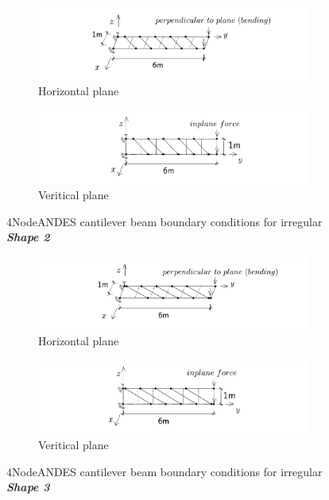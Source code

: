\documentclass[fleqn,11pt]{article}
\begin{document}
\begin{figure}[H]
  \centering
    \begin{subfigure}{0.5\textwidth}
      \centering
      \includegraphics[width=9cm]{../Figure-files/beam_ANDES_xy_bending_shape2.pdf}
      \caption{Horizontal plane}
    \end{subfigure}
    \begin{subfigure}{0.5\textwidth}
      \centering
      \includegraphics[width=9cm]{../Figure-files/beam_ANDES_yz_inPlane_shape2.pdf}
      \caption{Veritical  plane}
    \end{subfigure}
      \captionsetup{justification=centering,margin=3cm}
  \caption{4NodeANDES cantilever beam boundary conditions for irregular \textbf{\emph{Shape 2}} }
  \label{fig irregular shape 2 4NodeANDES cantilever beams bc}
\end{figure}





\begin{figure}[H]
  \centering
    \begin{subfigure}{0.5\textwidth}
      \centering
      \includegraphics[width=9cm]{../Figure-files/beam_ANDES_xy_bending_shape3.pdf}
      \caption{Horizontal plane}
    \end{subfigure}
    \begin{subfigure}{0.5\textwidth}
      \centering
      \includegraphics[width=9cm]{../Figure-files/beam_ANDES_yz_inPlane_shape3.pdf}
      \caption{Veritical  plane}
    \end{subfigure}
      \captionsetup{justification=centering,margin=3cm}
  \caption{4NodeANDES cantilever beam boundary conditions for irregular \textbf{\emph{Shape 3}} }
  \label{fig irregular shape 3 4NodeANDES cantilever beams bc}
\end{figure}
\end{document}
